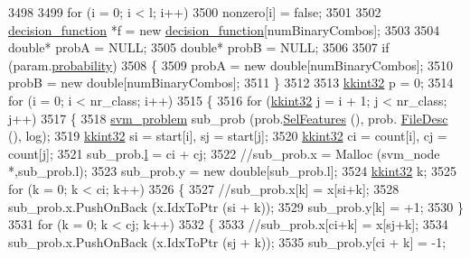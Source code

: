 \begin{DoxyCode}
{3498 
3499     \textcolor{keywordflow}{for}  (i = 0;  i < l;  i++)
3500       nonzero[i] = \textcolor{keyword}{false};
3501 
3502     \hyperlink{struct_s_v_m289___b_f_s_1_1decision__function}{decision\_function} *f = \textcolor{keyword}{new} \hyperlink{struct_s_v_m289___b_f_s_1_1decision__function}{decision\_function}[numBinaryCombos];
3503 
3504     \textcolor{keywordtype}{double}*  probA = NULL;
3505     \textcolor{keywordtype}{double}*  probB = NULL;
3506 
3507     \textcolor{keywordflow}{if} (param.\hyperlink{struct_s_v_m289___b_f_s_1_1svm__parameter_acfe1c2e7915f38fd2c82cbf7403f6428}{probability})
3508     \{
3509       probA = \textcolor{keyword}{new} \textcolor{keywordtype}{double}[numBinaryCombos];
3510       probB = \textcolor{keyword}{new} \textcolor{keywordtype}{double}[numBinaryCombos];
3511     \}
3512 
3513     \hyperlink{namespace_k_k_b_a8fa4952cc84fda1de4bec1fbdd8d5b1b}{kkint32} p = 0;
3514     \textcolor{keywordflow}{for}  (i = 0;  i < nr\_class;  i++)
3515     \{
3516       \textcolor{keywordflow}{for}  (\hyperlink{namespace_k_k_b_a8fa4952cc84fda1de4bec1fbdd8d5b1b}{kkint32} j = i + 1;  j < nr\_class;  j++)
3517       \{
3518         \hyperlink{struct_s_v_m289___b_f_s_1_1svm__problem}{svm\_problem}  sub\_prob (prob.\hyperlink{struct_s_v_m289___b_f_s_1_1svm__problem_a3127cc3a9a6352218c227051f2608caa}{SelFeatures} (), prob.
      \hyperlink{struct_s_v_m289___b_f_s_1_1svm__problem_a0b0e37f9bfd7753f691070fdcd05569f}{FileDesc} (), log);
3519         \hyperlink{namespace_k_k_b_a8fa4952cc84fda1de4bec1fbdd8d5b1b}{kkint32} si = start[i], sj = start[j];
3520         \hyperlink{namespace_k_k_b_a8fa4952cc84fda1de4bec1fbdd8d5b1b}{kkint32} ci = count[i], cj = count[j];
3521         sub\_prob.\hyperlink{struct_s_v_m289___b_f_s_1_1svm__problem_afd75fe2ff65aa0c0f27b85b04028b2f3}{l} = ci + cj;
3522         \textcolor{comment}{//sub\_prob.x = Malloc (svm\_node *,sub\_prob.l);}
3523         sub\_prob.y = \textcolor{keyword}{new} \textcolor{keywordtype}{double}[sub\_prob.l];
3524         \hyperlink{namespace_k_k_b_a8fa4952cc84fda1de4bec1fbdd8d5b1b}{kkint32} k;
3525         \textcolor{keywordflow}{for}  (k = 0;  k < ci;  k++)
3526         \{
3527           \textcolor{comment}{//sub\_prob.x[k] = x[si+k];}
3528           sub\_prob.x.PushOnBack (x.IdxToPtr (si + k));
3529           sub\_prob.y[k] = +1;
3530         \}
3531         \textcolor{keywordflow}{for}  (k = 0;  k < cj;  k++)
3532         \{
3533           \textcolor{comment}{//sub\_prob.x[ci+k] = x[sj+k];}
3534           sub\_prob.x.PushOnBack (x.IdxToPtr (sj + k));
3535           sub\_prob.y[ci + k] = -1;
}
\end{DoxyCode}
